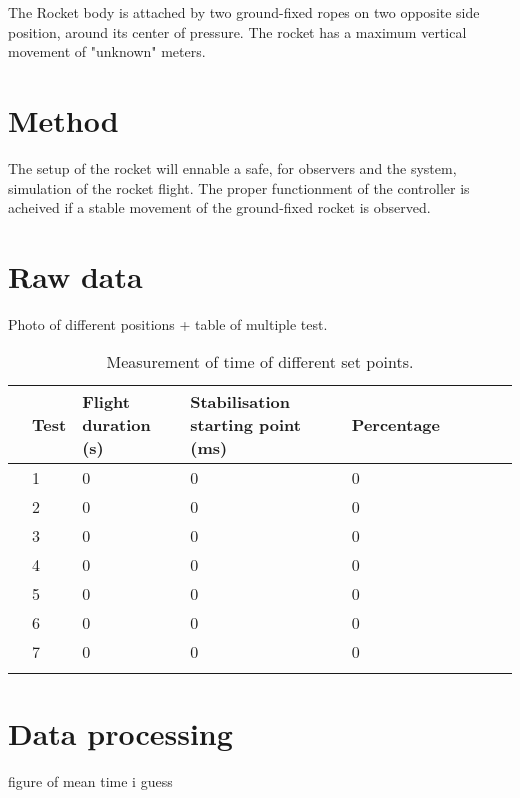  The Rocket body is attached by two ground-fixed ropes on two opposite side position, around its center of pressure. The rocket has a maximum vertical movement of "unknown" meters.




	\section*{Method}
	
 The setup of the rocket will ennable a safe, for observers and the system, simulation of the rocket flight. The proper functionment of the controller is acheived if a stable movement of the ground-fixed rocket is observed.



	\section*{Raw data}

Photo of different positions + table of multiple test.


\begin{table}[htbp]
	\centering
	\caption{Measurement of time of different set points.}
	\label{tab_appendix:Flight_time_setpoints}
	\begin{tabularx}{\textwidth}{lXXXXXXXX}
		& Test & Flight duration {(}s{)} & Stabilisation starting point {(}ms{)} & Percentage \\ \toprule 
		&1 & 0 & 0 & 0 \\ \rowcolor{lightGrey}
		&2 & 0 & 0 & 0 \\
	    &3 & 0 & 0 & 0 \\ \rowcolor{lightGrey}
		&4 & 0 & 0 & 0 \\ 
		&5 & 0 & 0 & 0 \\ \rowcolor{lightGrey}
		&6 & 0 & 0 & 0 \\ 
		&7 & 0 & 0 & 0 \\ \rowcolor{lightGrey}
	\end{tabularx}
\end{table}

	\section*{Data processing}

figure of mean time i guess

